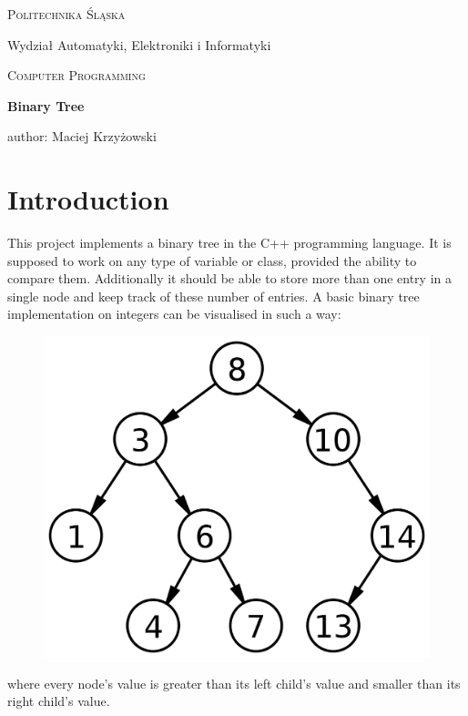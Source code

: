 \documentclass[12pt]{article}
\begin{document}
\begin{titlepage}
    \centering
    {\scshape\LARGE Politechnika Śląska

    Wydział Automatyki, Elektroniki i Informatyki\par}
    \vspace{1cm}
    {\scshape\Large Computer Programming\par}
    \vspace{1.5cm}
    {\huge\bfseries Binary Tree\par}
    \vspace{2cm}
    \vfill
    author:
    Maciej Krzyżowski\par
    \vfill
\end{titlepage}

\renewcommand*\contentsname{Table of contents}
\tableofcontents
\pagebreak

\section{Introduction}
This project implements a binary tree in the C++ programming language. It is supposed to work on any type of variable or class, provided the ability to compare them. Additionally it should be able to store more than one entry in a single node and keep track of these number of entries. A basic binary tree implementation on integers can be visualised in such a way:

\begin{figure}[H]
    \centering
    \includegraphics[width=0.75\linewidth]{tree1}
\end{figure}

where every node's value is greater than its left child's value and smaller than its right child's value.
\end{document}
